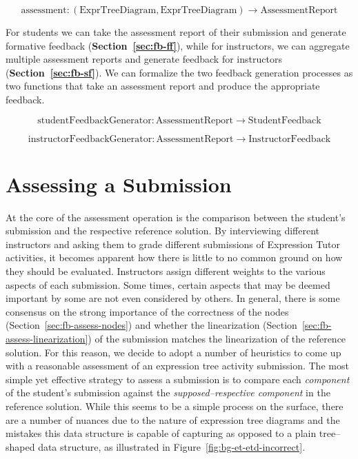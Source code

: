 \begin{chapterBody}
\[
\text{assessment}:
\left(\text{ExprTreeDiagram}, \text{ExprTreeDiagram}\right)
\rightarrow
\text{AssessmentReport}
\]

For students we can take the assessment report of their submission
and generate formative feedback (\textbf{Section~\ref{sec:fb-ff}}),
while for instructors, we can aggregate multiple assessment reports and
generate feedback for instructors (\textbf{Section~\ref{sec:fb-sf}}).
We can formalize the two feedback generation processes as two functions
that take an assessment report and produce the appropriate feedback.

\[
\text{studentFeedbackGenerator}:
\text{AssessmentReport}
\rightarrow
\text{StudentFeedback}
\]


\[
\text{instructorFeedbackGenerator}:
\text{AssessmentReport}
\rightarrow
\text{InstructorFeedback}
\]

\section{Assessing a Submission}\label{sec:fb-assess}

At the core of the assessment operation is the comparison between the
student's submission and the respective reference solution.
By interviewing different instructors and asking them to grade different
submissions of Expression Tutor activities, it becomes apparent how there is
little to no common ground on how they should be evaluated. Instructors assign
different weights to the various aspects of each submission. Some times, certain
aspects that may be deemed important by some are not even considered by others.
In general, there is some consensus on the strong importance of the correctness
of the nodes (Section~\ref{sec:fb-assess-nodes}) and whether the linearization 
(Section~\ref{sec:fb-assess-linearization}) of the submission matches the 
linearization of the reference solution.
For this reason, we decide to adopt a number of heuristics to come up with a
reasonable assessment of an expression tree activity submission.
The most simple yet effective strategy to assess a submission is to compare
each  \textit{component} of the student's submission against the
\textit{supposed–respective component} in the reference solution. While
this seems to be a simple process on the surface, there are a number of nuances
due to the nature of expression tree diagrams and the mistakes this data
structure is capable of capturing as opposed to a plain tree–shaped
data structure, as illustrated in Figure~\ref{fig:bg-et-etd-incorrect}.


\end{chapterBody}
